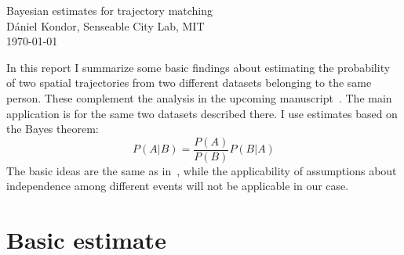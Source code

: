 \documentclass[a4paper]{article}
\begin{document}
	\begin{center}
		{\huge Bayesian estimates for trajectory matching} \\[2ex]
		{\large D\'aniel Kondor, Senseable City Lab, MIT} \\[1ex]
		{\large \today}
	\end{center}
	
	In this report I summarize some basic findings about estimating the probability of two spatial trajectories from two different datasets belonging
	to the same person. These complement the analysis in the upcoming manuscript~\cite{matchingpaper}. The main application is for the same two
	datasets described there. I use estimates based on the Bayes theorem:
	\begin{equation}
		P(A|B) = \frac{P(A)}{P(B)} P(B|A)
	\end{equation}
	The basic ideas are the same as in~\cite{Juhasz}, while the applicability of assumptions about independence among different events will not be
	applicable in our case.
	
	\section{Basic estimate}
	
\end{document}
